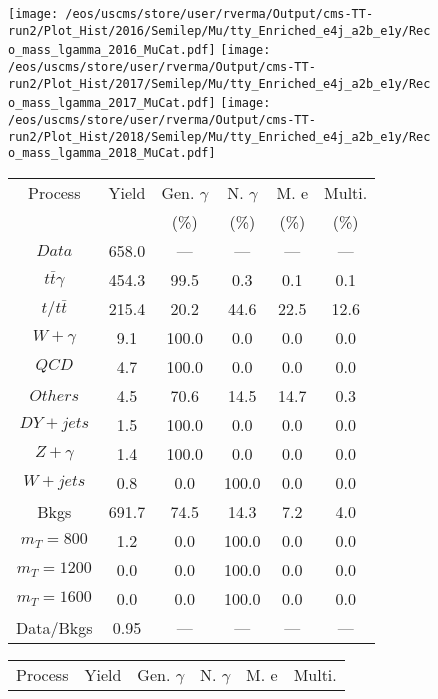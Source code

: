 \begin{figure}
\centering
\texttt{[image: /eos/uscms/store/user/rverma/Output/cms-TT-run2/Plot\_Hist/2016/Semilep/Mu/tty\_Enriched\_e4j\_a2b\_e1y/Reco\_mass\_lgamma\_2016\_MuCat.pdf]}
\texttt{[image: /eos/uscms/store/user/rverma/Output/cms-TT-run2/Plot\_Hist/2017/Semilep/Mu/tty\_Enriched\_e4j\_a2b\_e1y/Reco\_mass\_lgamma\_2017\_MuCat.pdf]}
\texttt{[image: /eos/uscms/store/user/rverma/Output/cms-TT-run2/Plot\_Hist/2018/Semilep/Mu/tty\_Enriched\_e4j\_a2b\_e1y/Reco\_mass\_lgamma\_2018\_MuCat.pdf]}
\begin{minipage}[c]{0.32\textwidth}
\centering
\tiny{
\begin{tabular}{cccccc}
\hline
Process & Yield & Gen. $\gamma$ & N. $\gamma$ & M. e & Multi. \\
 &  & (\%) & (\%) & (\%) & (\%)  \\
\hline
                                                                      $ Data $ &  658.0 &  --- &  --- &  --- &  ---\\
$ t\bar{t}\gamma $ &  454.3 &  99.5 &  0.3 &  0.1 &  0.1\\
$ t/t\bar{t} $ &  215.4 &  20.2 &  44.6 &  22.5 &  12.6\\
$ W+\gamma $ &  9.1 &  100.0 &  0.0 &  0.0 &  0.0\\
$ QCD $ &  4.7 &  100.0 &  0.0 &  0.0 &  0.0\\
$ Others $ &  4.5 &  70.6 &  14.5 &  14.7 &  0.3\\
$ DY+jets $ &  1.5 &  100.0 &  0.0 &  0.0 &  0.0\\
$ Z+\gamma $ &  1.4 &  100.0 &  0.0 &  0.0 &  0.0\\
$ W+jets $ &  0.8 &  0.0 &  100.0 &  0.0 &  0.0\\
Bkgs &  691.7 &  74.5 &  14.3 &  7.2 &  4.0\\
$ m_{T} = 800 $ &  1.2 &  0.0 &  100.0 &  0.0 &  0.0\\
$ m_{T} = 1200 $ &  0.0 &  0.0 &  100.0 &  0.0 &  0.0\\
$ m_{T} = 1600 $ &  0.0 &  0.0 &  100.0 &  0.0 &  0.0\\
Data/Bkgs &  0.95 &  --- &  --- &  --- &  ---\\
\hline
\end{tabular}
}
\end{minipage}
\begin{minipage}[c]{0.32\textwidth}
\centering
\tiny{
\begin{tabular}{cccccc}
\hline
Process & Yield & Gen. $\gamma$ & N. $\gamma$ & M. e & Multi. \\

\end{tabular}}
\end{minipage}
\end{figure}
